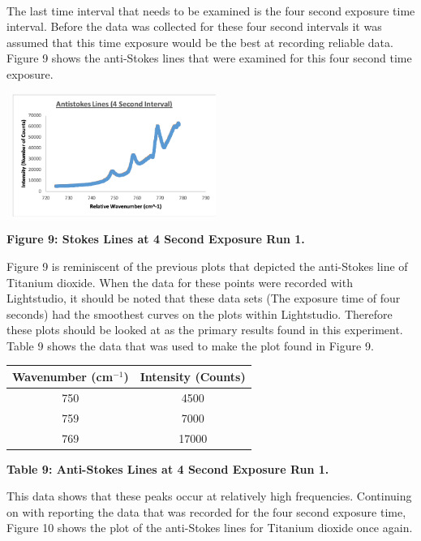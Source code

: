 \documentclass[]{article}
\begin{document}
\begin{multicols}{2}
\paragraph{}
\setlength{\parskip}{1em}
The last time interval that needs to be examined is the four second exposure time interval. Before the data was collected for these four second intervals it was assumed that this time exposure would be the best at recording reliable data. Figure 9 shows the anti-Stokes lines that were examined for this four second time exposure.
\begin{center}
    \includegraphics[width=7cm, height=4cm]{PHYS 331 RS (4 Sec) 1a.png}
    \caption{\textbf{\small{Figure 9:} Stokes Lines at 4 Second Exposure Run 1.}}
\end{center}
Figure 9 is reminiscent of the previous plots that depicted the anti-Stokes line of Titanium dioxide. When the data for these points were recorded with Lightstudio, it should be noted that these data sets (The exposure time of four seconds) had the smoothest curves on the plots within Lightstudio. Therefore these plots should be looked at as the primary results found in this experiment. Table 9 shows the data that was used to make the plot found in Figure 9.
\newline
\begin{tabular}{|c|c|}
    \hline \textbf{Wavenumber (cm$^{-1}$)} & \textbf{Intensity (Counts)} \\ \hline
    750 & 4500 \\ \hline
    759 & 7000 \\ \hline
    769 & 17000 \\ \hline
\end{tabular}
\centerline{\tiny\textbf{{Table 9: Anti-Stokes Lines at 4 Second Exposure Run 1.}}}
\newline
This data shows that these peaks occur at relatively high frequencies. Continuing on with reporting the data that was recorded for the four second exposure time, Figure 10 shows the plot of the anti-Stokes lines for Titanium dioxide once again.

\end{multicols}
\end{document}
